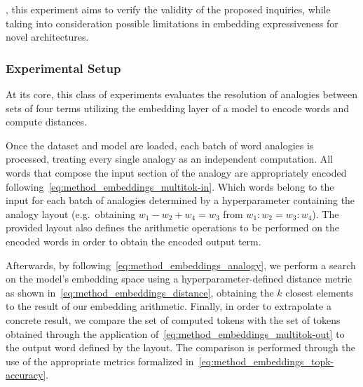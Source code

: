 , this experiment aims to verify the validity of the proposed inquiries, while taking into consideration possible limitations in embedding expressiveness for novel architectures.

\subsubsection{Experimental Setup}\label{sssec:exp_emb_exp1_expset}

At its core, this class of experiments evaluates the resolution of analogies between sets of four terms utilizing the embedding layer of a model to encode words and compute distances.

Once the dataset and model are loaded, each batch of word analogies is processed, treating every single analogy as an independent computation.
All words that compose the input section of the analogy are appropriately encoded following~\cref{eq:method_embeddings_multitok-in}.
Which words belong to the input for each batch of analogies  determined by a hyperparameter containing the analogy layout (e.g.\ obtaining $w_1 - w_2 + w_4 = w_3$ from $w_1 : w_2 = w_3 : w_4$).
The provided layout also defines the arithmetic operations to be performed on the encoded words in order to obtain the encoded output term.

Afterwards, by following~\cref{eq:method_embeddings_analogy}, we perform a search on the model's embedding space using a hyperparameter-defined distance metric as shown in~\cref{eq:method_embeddings_distance}, obtaining the $k$ closest elements to the result of our embedding arithmetic.
Finally, in order to extrapolate a concrete result, we compare the set of computed tokens with the set of tokens obtained through the application of~\cref{eq:method_embeddings_multitok-out} to the output word defined by the layout.
The comparison is performed through the use of the appropriate metrics formalized in~\cref{eq:method_embeddings_topk-accuracy}.


